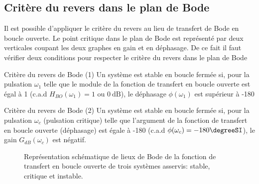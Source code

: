 \subsection{Critère du revers dans le plan de Bode
}
Il est possible d'appliquer le critère du revers au lieu de transfert de Bode
en boucle ouverte. Le point critique
dans le plan de Bode est représenté par deux verticales coupant les deux 
graphes en gain et en déphasage. De ce fait il faut vérifier deux conditions 
pour respecter le critère du revers dans le plan de Bode 
\begin{criteria}{Critère du revers de Bode (1)}
    Un système est stable en boucle fermée si, pour la pulsation 
    $\omega_{1}$ telle que le module de la fonction de transfert en boucle 
    ouverte est égal à 1 (c.a.d $H_{BO}(\omega_{1})=1$ ou $\SI{0}{\dB}$), 
    le déphasage $\phi(\omega_1)$ est supérieur à -180\degreeSI
\end{criteria}
\begin{criteria}{Critère du revers de Bode (2)}
    Un système est stable en boucle fermée si, pour la pulsation 
    $\omega_{c}$ (pulsation critique) telle que l'argument de la fonction de 
    transfert en boucle ouverte (déphasage) est égale à -180\degreeSI 
    (c.a.d $\phi(\omega_c)=-180\degreeSI$), le gain $G_{dB}(\omega_c)$ est 
    négatif.
\end{criteria}
\begin{figure}[!h]
\centering
    
    \caption{Représentation schématique de lieux de Bode de la fonction 
             de transfert en boucle ouverte de trois systèmes asservis: 
             stable, critique et instable.}
\end{figure}
